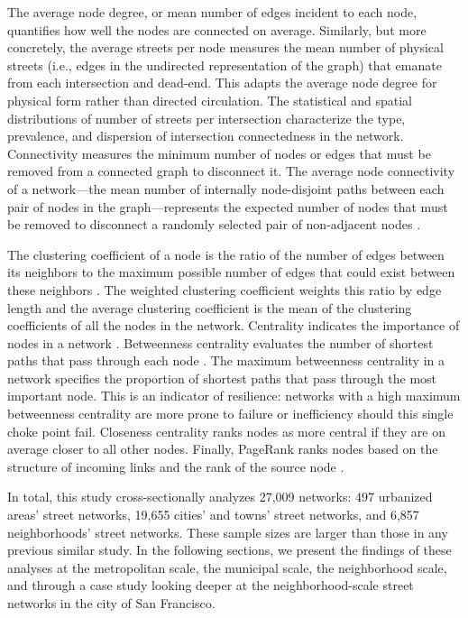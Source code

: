 \documentclass{article}
\begin{document}
The average node degree, or mean number of edges incident to each node, quantifies how well the nodes are connected on average. Similarly, but more concretely, the average streets per node measures the mean number of physical streets (i.e., edges in the undirected representation of the graph) that emanate from each intersection and dead-end. This adapts the average node degree for physical form rather than directed circulation. The statistical and spatial distributions of number of streets per intersection characterize the type, prevalence, and dispersion of intersection connectedness in the network. Connectivity measures the minimum number of nodes or edges that must be removed from a connected graph to disconnect it. The average node connectivity of a network---the mean number of internally node-disjoint paths between each pair of nodes in the graph---represents the expected number of nodes that must be removed to disconnect a randomly selected pair of non-adjacent nodes \cite{beineke_average_2002,dankelmann_bounds_2003}. 

The clustering coefficient of a node is the ratio of the number of edges between its neighbors to the maximum possible number of edges that could exist between these neighbors \cite{jiang_topological_2004, opsahl_clustering_2009}. The weighted clustering coefficient weights this ratio by edge length and the average clustering coefficient is the mean of the clustering coefficients of all the nodes in the network. Centrality indicates the importance of nodes in a network \cite{huang_trajgraph:_2016, zhong_revealing_2017}. Betweenness centrality evaluates the number of shortest paths that pass through each node \cite{barthelemy_betweenness_2004}. The maximum betweenness centrality in a network specifies the proportion of shortest paths that pass through the most important node. This is an indicator of resilience: networks with a high maximum betweenness centrality are more prone to failure or inefficiency should this single choke point fail. Closeness centrality ranks nodes as more central if they are on average closer to all other nodes. Finally, PageRank ranks nodes based on the structure of incoming links and the rank of the source node \cite{brin_anatomy_1998, jiang_predicting_2008, agryzkov_algorithm_2012, chin_geographically_2015, gleich_pagerank_2015}.

In total, this study cross-sectionally analyzes 27,009 networks: 497 urbanized areas' street networks, 19,655 cities' and towns' street networks, and 6,857 neighborhoods' street networks. These sample sizes are larger than those in any previous similar study. In the following sections, we present the findings of these analyses at the metropolitan scale, the municipal scale, the neighborhood scale, and through a case study looking deeper at the neighborhood-scale street networks in the city of San Francisco.
\end{document}
